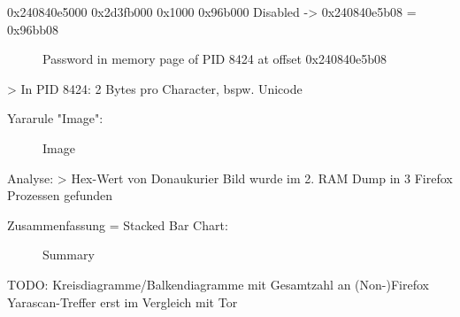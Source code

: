 				0x240840e5000	0x2d3fb000	0x1000	0x96b000	Disabled
					-> 0x240840e5b08 = 0x96bb08
					\begin{figure}[h!]
						\centerline{}
						\label{chart:final-criteria}  
						\caption{Password in memory page of PID 8424 at offset 0x240840e5b08}
					\end{figure}
		> In PID 8424: 2 Bytes pro Character, bspw. Unicode
				
Yararule "Image":
	\begin{figure}[h!]
		\centerline{}
		\label{chart:final-criteria}  
		\caption{Image}
	\end{figure}
	Analyse:
		> Hex-Wert von Donaukurier Bild wurde im 2. RAM Dump in 3 Firefox Prozessen gefunden
	

Zusammenfassung = Stacked Bar Chart:
\begin{figure}[h!]
	\centerline{}
	\label{chart:final-criteria}  
	\caption{Summary}
\end{figure}

TODO: Kreisdiagramme/Balkendiagramme mit Gesamtzahl an (Non-)Firefox Yarascan-Treffer erst im Vergleich mit Tor


